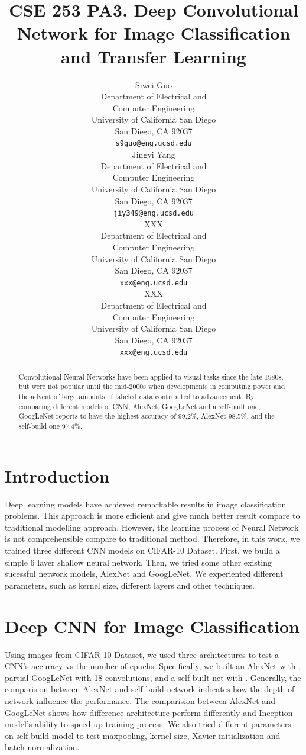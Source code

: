 \documentclass{article} %
\title{CSE 253 PA3. Deep Convolutional Network for Image Classification and Transfer Learning}
\author{
Siwei Guo \\
Department of Electrical and\\ 
Computer Engineering\\
University of California San Diego\\
San Diego, CA 92037 \\
\texttt{s9guo@eng.ucsd.edu} \\
\And
Jingyi Yang \\
Department of Electrical and\\ 
Computer Engineering\\
University of California San Diego\\
San Diego, CA 92037 \\
\texttt{jiy349@eng.ucsd.edu} \\
\And
XXX \\
Department of Electrical and\\ 
Computer Engineering\\
University of California San Diego\\
San Diego, CA 92037 \\
\texttt{xxx@eng.ucsd.edu} \\
\And
XXX \\
Department of Electrical and\\ 
Computer Engineering\\
University of California San Diego\\
San Diego, CA 92037 \\
\texttt{xxx@eng.ucsd.edu} \\
}
\begin{document}
\maketitle

\begin{abstract}
Convolutional Neural Networks have been applied to visual tasks since the late 1980s, but were not popular until the mid-2000s when developments in computing power and the advent of large amounts of labeled data contributed to advancement. By comparing different models of CNN, AlexNet, GoogLeNet and a self-built one, GoogLeNet reports to have the highest accuracy of 99.2\%, AlexNet 98.5\%, and the self-build one 97.4\%.
\end{abstract}

\section{Introduction}
Deep learning models have achieved remarkable results in image classification problems. This approach is more efficient and give much better result compare to traditional modelling approach. However, the learning process of Neural Network is not comprehensible compare to traditional method. Therefore, in this work, we trained three different CNN models on CIFAR-10 Dataset. First, we build a simple 6 layer shallow neural network. Then, we tried some other existing sucessful network models, AlexNet and GoogLeNet. We experiented different parameters, such as kernel size, different layers and other techniques.


\section{Deep CNN for Image Classification}
Using images from CIFAR-10 Dataset, we used three architectures to test a CNN's accuracy vs the number of 
epochs. Specifically, we built an AlexNet with , partial GoogLeNet with 18 convolutions, and a self-built 
net with . Generally, the comparision between AlexNet and self-build network indicates how the depth of 
network influence the performance. The comparision between AlexNet and GoogLeNet shows how difference architecture
perform differently and Inception model's ability to speed up training process. We also tried different
parameters on self-build model to test maxpooling, kernel size, Xavier initialization and batch normalization. 
\end{document}
